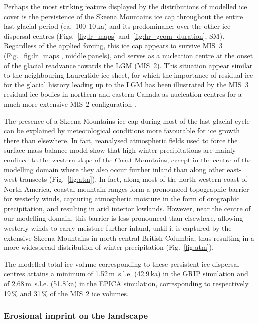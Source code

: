 \documentclass[tc, manuscript]{copernicus}
\begin{document}
Perhaps the most striking feature displayed by the distributions of modelled
ice cover is the persistence of the Skeena Mountains ice cap throughout the
entire last glacial period (ca.~100--10\,ka) and its predominance over the
other ice-dispersal centres
(Figs.~\ref{fig:lr_maps} and~\ref{fig:hr_geom_duration}, SM). Regardless of the applied
forcing, this ice cap appears to survive MIS~3 (Fig.~\ref{fig:lr_maps},
middle panels), and serves as a nucleation centre at the onset of the glacial
readvance towards the LGM (MIS~2). This situation appear similar to the
neighbouring Laurentide ice sheet, for which the importance of residual ice for the
glacial history leading up to the LGM has been illustrated by the
MIS~3 residual ice bodies in northern and eastern Canada as nucleation centres
for a much more extensive MIS~2 configuration \citep{Kleman.etal.2010}.

The presence of a Skeena Mountains ice cap during most of the last glacial
cycle can be explained by meteorological conditions more favourable for ice
growth there than elsewhere. In fact, reanalysed atmospheric fields used to
force the surface mass balance model show that high winter precipitations are
mainly confined to the western slope of the Coast Mountains, except in the
centre of the modelling domain where they also occur further inland than along
other east-west transects (Fig.~\ref{fig:atm}).
In fact, along most of the north-western coast of
North America, coastal mountain ranges form a pronounced topographic barrier
for westerly winds, capturing atmospheric moisture in the form of orographic
precipitation, and resulting in arid interior lowlands. However, near the
centre of our modelling domain, this barrier is less pronounced than elsewhere,
allowing westerly winds to carry moisture
further inland, until it is captured by the extensive Skeena Mountains in
north-central British Columbia, thus resulting in a more widespread
distribution of winter precipitation (Fig.~\ref{fig:atm}).

The modelled total ice volume corresponding to these persistent ice-dispersal
centres attains a minimum of 1.52\,m~s.l.e. (42.9\,ka) in the GRIP simulation
and of 2.68\,m~s.l.e. (51.8\,ka) in the EPICA simulation, corresponding to
respectively 19\,\% and 31\,\% of the MIS~2 ice volumes.

\subsubsection{Erosional imprint on the landscape}
\end{document}
